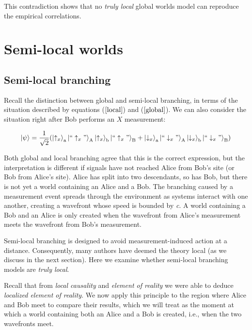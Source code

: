 \documentclass[12pt]{article}
\begin{document}
\noindent This contradiction shows that no \textit{truly local} global worlds model can reproduce the empirical correlations.  


\section{Semi-local worlds}  \label{Semi}

\subsection{Semi-local branching}  \label{sec:SLocBranch}

Recall the distinction between global and semi-local branching, in terms of the situation described by equations ($\ref{local}$) and ($\ref{global}$). We can also consider the situation right after Bob performs an $X$ measurement:

\begin{equation}\label{local2}
\Ket{\psi} = \frac{1}{\sqrt 2}(\Ket{\uparrow_x}_{\rm a}\Ket{``\uparrow_x"}_{\rm A}\Ket{\uparrow_x}_{\rm b}\Ket{``\uparrow_x"}_{\rm B}+
\Ket{\downarrow_x}_{\rm a}\Ket{``\downarrow_x"}_{\rm A}\Ket{\downarrow_x}_{\rm b}\Ket{``\downarrow_x"}_{\rm B})
\end{equation}

Both global and local branching agree that this is the correct expression, but the interpretation is different if signals have not reached Alice from Bob's site (or Bob from Alice's site). Alice has split into two descendants, so has Bob, but there is not yet a world containing an Alice and a Bob. The branching caused by a measurement event spreads through the environment as systems interact with one another, creating a wavefront whose speed is bounded by \textit{c}. A world containing a Bob and an Alice is only created when the wavefront from Alice's measurement meets the wavefront from Bob's measurement. 

Semi-local branching is designed to avoid measurement-induced action at a distance. Consequently, many authors have deemed the theory local (as we discuss in the next section). Here we examine whether semi-local branching models are \textit{truly local}. 

Recall that from \textit{local causality} and \textit{element of reality} we were able to deduce \textit{localized element of reality}. We now apply this principle to the region where Alice and Bob meet to compare their results, which we will treat as the moment at which a world containing both an Alice and a Bob is created, i.e., when the two wavefronts meet.
\end{document}
